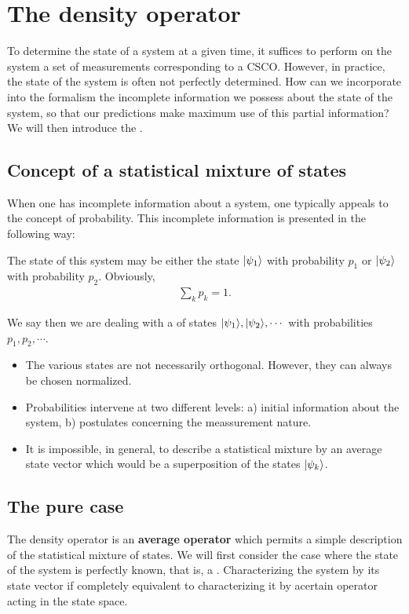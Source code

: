 \section{The density operator}

To determine the state of a system at a given time, it suffices to perform on the system a set of measurements corresponding to a CSCO.
However, in practice, the state of the system is often not perfectly determined.
How can we incorporate into the formalism the incomplete information we possess about the state of the system, so that our predictions make 
maximum use of this partial information? We will then introduce the .

\subsection{Concept of a statistical mixture of states}
When one has incomplete information about a system, one typically appeals to the concept of probability. This incomplete information is 
presented in the following way:
\begin{emphasizer}
    The state of this system may be either the state $|\psi_1\rangle$ with probability $p_1$ or $|\psi_2\rangle$ with probability $p_2$. Obviously,
    \begin{align*}
        \sum_kp_k=1.
    \end{align*}
\end{emphasizer}
We say then we are dealing with a  of states $|\psi_1\rangle,|\psi_2\rangle,\cdots$ with probabilities $p_1,p_2,\cdots$.

\begin{itemize}[itemsep=0pt,topsep=0pt]
    \item The various states are not necessarily orthogonal. However, they can always be chosen normalized.
    \item Probabilities intervene at two different levels: a) initial information about the system, b) postulates concerning the meassurement nature.
    \item It is impossible, in general, to describe a statistical mixture by an average state vector which would be a superposition of the states $|\psi_k\rangle$.
\end{itemize}

\subsection{The pure case}
The density operator is an \textbf{average operator} which permits a simple description of the statistical mixture of states. 
We will first consider the case where the state of the system is perfectly known, that is, a . Characterizing the system by its 
state vector if completely equivalent to characterizing it by acertain operator acting in the state space.
